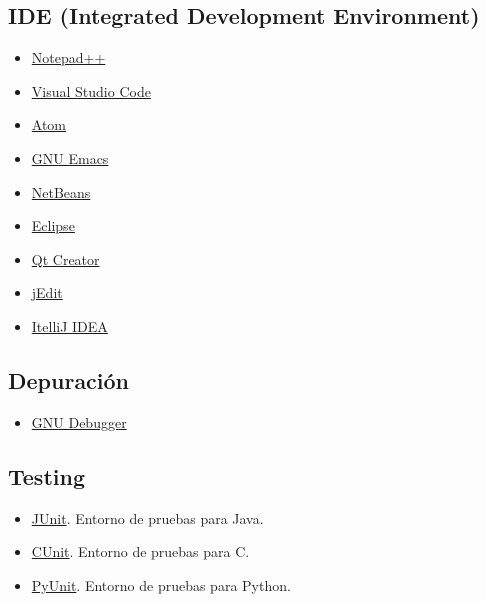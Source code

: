 \subsection{IDE (Integrated Development Environment)}
\begin{multicols}{2}
\begin{itemize}[nosep]
\item \href{https://notepad-plus-plus.org/}{Notepad++}
\item \href{https://code.visualstudio.com/}{Visual Studio Code}
\item \href{https://atom.io/}{Atom}
\item \href{https://www.gnu.org/s/emacs/}{GNU Emacs}
\item \href{https://netbeans.org/}{NetBeans}
\item \href{https://eclipse.org/}{Eclipse}
\item \href{https://www.qt.io/ide/}{Qt Creator}
\item \href{http://www.jedit.org/}{jEdit}
\item \href{https://www.jetbrains.com/idea/}{ItelliJ IDEA}
\end{itemize}
\end{multicols}



\subsection{Depuración}
\begin{itemize}[nosep]
\item \href{https://www.gnu.org/s/gdb/}{GNU Debugger}
\end{itemize}


\subsection{Testing}
\begin{multicols}{2}
\begin{itemize}[nosep]
\item \href{http://junit.org}{JUnit}. Entorno de pruebas para Java.
\item \href{http://cunit.sourceforge.net/}{CUnit}. Entorno de pruebas para C.
\item \href{https://wiki.python.org/moin/PyUnit}{PyUnit}. Entorno de pruebas para Python.
\end{itemize}
\end{multicols}

